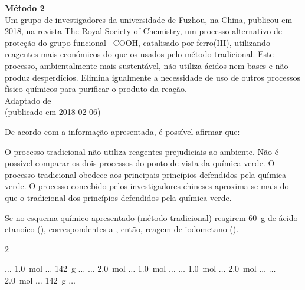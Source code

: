 \documentclass[addpoints]{exam}
\begin{document}
\begin{questions}
{\begin{minipage}{0.9\textwidth}
\begin{tcolorbox}
					
					\textbf{Método 2}\\
					Um grupo de investigadores da universidade de Fuzhou, na China, publicou em 2018, na revista The Royal Society of Chemistry, um processo alternativo de proteção do grupo funcional –COOH, catalisado por ferro(III), utilizando reagentes mais económicos do que os usados pelo método tradicional. Este processo, ambientalmente mais sustentável, não utiliza ácidos nem bases e não produz desperdícios. Elimina igualmente a necessidade de uso de outros processos físico-químicos para purificar o produto da reação.\\
					
					Adaptado de\\  (publicado em 2018-02-06)
				\end{tcolorbox}
				
			\end{minipage}
			
		}
		
		\vspace{5pt}
		\question[8] De acordo com a informação apresentada, é possível afirmar que:\\
		
		\begin{choices}
			\choice O processo tradicional não utiliza reagentes prejudiciais ao ambiente.
			\choice Não é possível comparar os dois processos do ponto de vista da química verde.
			\choice O processo tradicional obedece aos principais princípios defendidos pela química verde.
			\correctchoice O processo concebido pelos investigadores chineses aproxima-se mais do que o tradicional dos princípios defendidos pela química verde.
		\end{choices}
		
		\vspace{5pt}
		\question[8] Se no esquema químico apresentado (método tradicional) reagirem \SI{60}{\gram} de ácido etanoico (), correspondentes a \underline{\hspace{50pt}}, então, reagem \underline{\hspace{50pt}} de iodometano (\ce{CH3I}).\\
		
		\begin{multicols}{2}
			\begin{choices}
				\correctchoice $\ldots$ \SI{1,0}{\mole} $\ldots$ \SI{142}{\gram} $\ldots$
				\choice $\ldots$ \SI{2,0}{\mole} $\ldots$ \SI{1,0}{\mole} $\ldots$
				\choice $\ldots$ \SI{1,0}{\mole} $\ldots$ \SI{2,0}{\mole} $\ldots$
				\choice $\ldots$ \SI{2,0}{\mole} $\ldots$ \SI{142}{\gram} $\ldots$
			\end{choices}
		\end{multicols}
		

\end{questions}
\end{document}
